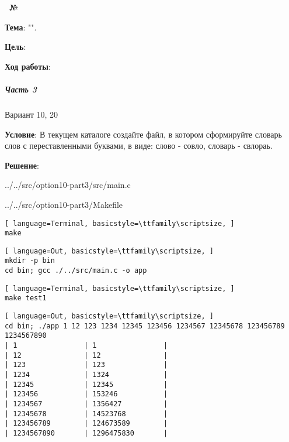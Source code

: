 \begin{center}
    \textbf{\titlePageTypeWork~№\titlePageNumberWork}
\end{center}

\textbf{Тема}: "\titlePageTopic".

\textbf{Цель}: 

\begin{center}
    \textbf{Ход работы}:
\end{center}



\subparagraph{Часть 3} Вариант 10, 20

\textbf{Условие}:
В текущем каталоге создайте файл, в котором сформируйте словарь слов с переставленными буквами, в виде:
слово - совло,
словарь - свлораь.

\textbf{Решение}:


{../../src/option10-part3/src/main.c}


{../../src/option10-part3/Makefile}


\begin{lstlisting}[ language=Terminal, basicstyle=\ttfamily\scriptsize, ]
make
\end{lstlisting}

\begin{lstlisting}[ language=Out, basicstyle=\ttfamily\scriptsize, ]
mkdir -p bin
cd bin; gcc ./../src/main.c -o app
\end{lstlisting}


\begin{lstlisting}[ language=Terminal, basicstyle=\ttfamily\scriptsize, ]
make test1
\end{lstlisting}

\begin{lstlisting}[ language=Out, basicstyle=\ttfamily\scriptsize, ]
cd bin; ./app 1 12 123 1234 12345 123456 1234567 12345678 123456789 1234567890
| 1                | 1                |
| 12               | 12               |
| 123              | 123              |
| 1234             | 1324             |
| 12345            | 12345            |
| 123456           | 153246           |
| 1234567          | 1356427          |
| 12345678         | 14523768         |
| 123456789        | 124673589        |
| 1234567890       | 1296475830       |
\end{lstlisting}


